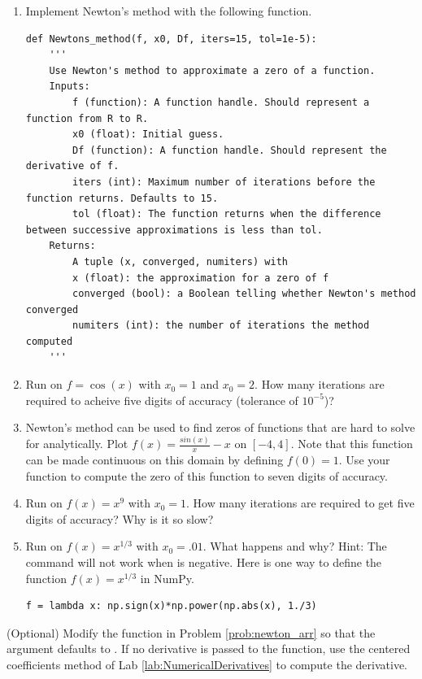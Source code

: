 \begin{problem}
\label{prob:newton_arr}
\leavevmode
\begin{enumerate}
\item Implement Newton's method with the following function.
\begin{lstlisting}
def Newtons_method(f, x0, Df, iters=15, tol=1e-5):
    '''
    Use Newton's method to approximate a zero of a function.
    Inputs:
        f (function): A function handle. Should represent a function from R to R.
        x0 (float): Initial guess.
        Df (function): A function handle. Should represent the derivative of f.
        iters (int): Maximum number of iterations before the function returns. Defaults to 15.
        tol (float): The function returns when the difference between successive approximations is less than tol.
    Returns:
        A tuple (x, converged, numiters) with
        x (float): the approximation for a zero of f
        converged (bool): a Boolean telling whether Newton's method converged
        numiters (int): the number of iterations the method computed
    '''
\end{lstlisting}

\item Run  on $f=\cos(x)$ with $x_0=1$ and $x_0=2$. 
How many iterations are required to acheive five digits of accuracy (tolerance of $10^{-5}$)?
\item Newton's method can be used to find zeros of functions that are hard to solve for analytically.
Plot $f(x) = \frac{sin(x)}{x}-x$ on $[-4, 4]$. 
Note that this function can be made continuous on this domain by defining $f(0)=1$. 
Use your function  to compute the zero of this function to seven digits of accuracy.
\item Run  on $f(x)=x^9$ with $x_0=1$.  
How many iterations are required to get five digits of accuracy?  Why is it so slow?
\item Run  on $f(x)=x^{1/3}$ with $x_0=.01$. 
What happens and why?
Hint: The command  will not work when  is negative. 
Here is one way to define the function $f(x)=x^{1/3}$ in NumPy.
\begin{lstlisting}
f = lambda x: np.sign(x)*np.power(np.abs(x), 1./3)
\end{lstlisting}
\end{enumerate}
\end{problem}

\begin{problem}(Optional)
Modify the function  in Problem \ref{prob:newton_arr} so that the argument  defaults to .
If no derivative is passed to the function, use the centered coefficients method of Lab \ref{lab:NumericalDerivatives} to compute the derivative.
\end{problem}

